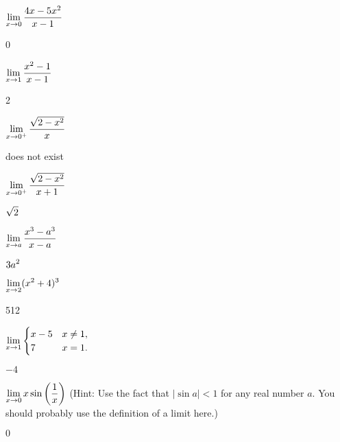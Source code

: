 \begin{exercises}
\begin{exercise} $\displaystyle \lim _{x\to 0 } {4x - 5x^2\over x-1}$
\begin{answer} 0
\end{answer}\end{exercise}

\begin{exercise} $\displaystyle\lim _{x\to 1 } {x^2 -1 \over x-1 }$
\begin{answer} 2
\end{answer}\end{exercise}

\begin{exercise} $\displaystyle\lim _{x\to 0^ + } {\sqrt{2-x^2 }\over x}$
\begin{answer} does not exist
\end{answer}\end{exercise}

\begin{exercise} $\displaystyle\lim _{x\to 0^ + } {\sqrt{2-x^2}\over x+1}$
\begin{answer} $\displaystyle \sqrt2$
\end{answer}\end{exercise}

\begin{exercise} $\displaystyle\lim _{x\to a } {x^3 -a^3\over x-a}$
\begin{answer} $\displaystyle 3a^2$
\end{answer}\end{exercise}

\begin{exercise} $\displaystyle\lim _{x\to 2 } (x^2 +4)^3$
\begin{answer} 512
\end{answer}\end{exercise}

\begin{exercise} $\displaystyle\lim _{x\to 1 } \begin{cases}
x-5 & x\neq 1, \\
7 & x=1. \end{cases}$
\begin{answer} $-4$
\end{answer}\end{exercise}

\endtwocol


\begin{exercise} $\displaystyle\lim _{x\to 0 } x\sin \left( {1\over x}\right)$
(Hint: Use the fact that $|\sin a |< 1 $ for any real number $a$. You
should probably use the definition of a limit here.)
\begin{answer} $0$
\end{answer}\end{exercise}


\end{exercises}
